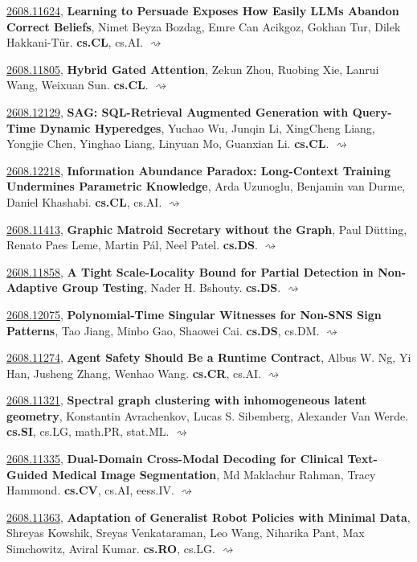 \documentclass[9pt, a4paper]{article}
\theoremstyle{plain}
\theoremstyle{definition}
\theoremstyle{remark}
\newcommand{\arxiv}[3]{\href{https://arxiv.org/abs/#1}{#1}, \textbf{\textcolor{arxivblue}{#2}}, #3. }
\begin{document}
\arxiv{2608.11624}{Learning to Persuade Exposes How Easily LLMs Abandon Correct Beliefs}{Nimet Beyza Bozdag, Emre Can Acikgoz, Gokhan Tur, Dilek Hakkani-Tür}\textbf{cs.CL}, cs.AI. \hyperlink{2608.11624}{$\rightsquigarrow$}

\arxiv{2608.11805}{Hybrid Gated Attention}{Zekun Zhou, Ruobing Xie, Lanrui Wang, Weixuan Sun}\textbf{cs.CL}. \hyperlink{2608.11805}{$\rightsquigarrow$}

\arxiv{2608.12129}{SAG: SQL-Retrieval Augmented Generation with Query-Time Dynamic Hyperedges}{Yuchao Wu, Junqin Li, XingCheng Liang, Yongjie Chen, Yinghao Liang, Linyuan Mo, Guanxian Li}\textbf{cs.CL}. \hyperlink{2608.12129}{$\rightsquigarrow$}

\arxiv{2608.12218}{Information Abundance Paradox: Long-Context Training Undermines Parametric Knowledge}{Arda Uzunoglu, Benjamin van Durme, Daniel Khashabi}\textbf{cs.CL}, cs.AI. \hyperlink{2608.12218}{$\rightsquigarrow$}

\arxiv{2608.11413}{Graphic Matroid Secretary without the Graph}{Paul Dütting, Renato Paes Leme, Martin Pál, Neel Patel}\textbf{cs.DS}. \hyperlink{2608.11413}{$\rightsquigarrow$}

\arxiv{2608.11858}{A Tight Scale-Locality Bound for Partial Detection in Non-Adaptive Group Testing}{Nader H. Bshouty}\textbf{cs.DS}. \hyperlink{2608.11858}{$\rightsquigarrow$}

\arxiv{2608.12075}{Polynomial-Time Singular Witnesses for Non-SNS Sign Patterns}{Tao Jiang, Minbo Gao, Shaowei Cai}\textbf{cs.DS}, cs.DM. \hyperlink{2608.12075}{$\rightsquigarrow$}

\arxiv{2608.11274}{Agent Safety Should Be a Runtime Contract}{Albus W. Ng, Yi Han, Jusheng Zhang, Wenhao Wang}\textbf{cs.CR}, cs.AI. \hyperlink{2608.11274}{$\rightsquigarrow$}

\arxiv{2608.11321}{Spectral graph clustering with inhomogeneous latent geometry}{Konstantin Avrachenkov, Lucas S. Sibemberg, Alexander Van Werde}\textbf{cs.SI}, cs.LG, math.PR, stat.ML. \hyperlink{2608.11321}{$\rightsquigarrow$}

\arxiv{2608.11335}{Dual-Domain Cross-Modal Decoding for Clinical Text-Guided Medical Image Segmentation}{Md Maklachur Rahman, Tracy Hammond}\textbf{cs.CV}, cs.AI, eess.IV. \hyperlink{2608.11335}{$\rightsquigarrow$}

\arxiv{2608.11363}{Adaptation of Generalist Robot Policies with Minimal Data}{Shreyas Kowshik, Sreyas Venkataraman, Leo Wang, Niharika Pant, Max Simchowitz, Aviral Kumar}\textbf{cs.RO}, cs.LG. \hyperlink{2608.11363}{$\rightsquigarrow$}
\end{document}
